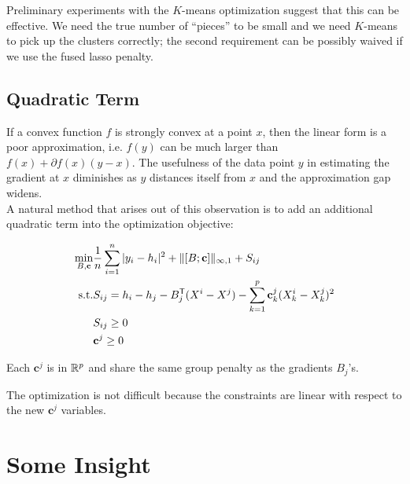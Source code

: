 \documentclass{article}
\begin{document}
Preliminary experiments with the $K$-means optimization suggest that this can be effective. We need the true number of ``pieces'' to be small and we need $K$-means to pick up the clusters correctly; the second requirement can be possibly waived if we use the fused lasso penalty.

\begin{figure}
\end{figure}

\subsection{Quadratic Term}

If a convex function $f$ is strongly convex at a point $x$, then the linear form is a poor approximation, i.e. $f(y)$ can be much larger than $f(x) + \partial f(x) (y - x)$. The usefulness of the data point $y$ in estimating the gradient at $x$ diminishes as $y$ distances itself from $x$ and the approximation gap widens. \\

A natural method that arises out of this observation is to add an additional quadratic term into the optimization objective:

\begin{align*}
\min_{B, \mathbf{c}} & \frac{1}{n} \sum_{i=1}^n | y_i - h_i|^2 + \| [B; \mathbf{c}] \|_{\infty,1} + S_{ij}  \\
\textrm{s.t.} & S_{ij} = h_i - h_j - B_j^{\mathsf{T}} (X^i - X^j) - \sum_{k=1}^p \mathbf{c}^j_k (X^i_k - X^j_k)^2 \\
			& S_{ij} \geq 0 \\
			& \mathbf{c}^j \geq 0 \\
\end{align*}

Each $\mathbf{c}^j$ is in $\mathbb{R}^p$ and share the same group penalty as the gradients $B_j$'s.

The optimization is not difficult because the constraints are linear with respect to the new $\mathbf{c}^j$ variables.

\newpage

\section{Some Insight}
\end{document}
